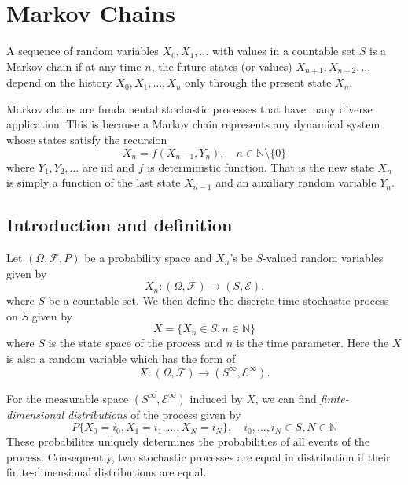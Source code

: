 \documentclass[twoside]{article}
\theoremstyle{definition}
\theoremstyle{remark}
\theoremstyle{remark}
\begin{document}
\section{Markov Chains}
A sequence of random variables $X_0, X_1, \ldots$ with values in a countable
set $S$ is a Markov chain if at any time $n$, the future states (or values)
$X_{n+1}, X_{n+2}, \ldots$ depend on the history $X_0, X_1, \ldots, X_n$ only
through the present state $X_n$.

Markov chains are fundamental stochastic processes that have many diverse
application. This is because a Markov chain represents any dynamical system
whose states satisfy the recursion
\begin{equation}
  X_n = f(X_{n-1}, Y_n), \quad n \in \mathbb{N} \setminus {\{0\}}
\end{equation}
where $Y_1, Y_2, \ldots$ are iid and $f$ is deterministic function. That is
the new state $X_n$ is simply a function of the last state $X_{n-1}$ and
an auxiliary random variable $Y_n$.

\subsection{Introduction and definition}
Let $(\Omega, \mathcal{F}, P)$ be a probability space and $X_n$'s be $S$-valued
random variables given by
\begin{equation}
  X_n : (\Omega, \mathcal{F}) \rightarrow (S, \mathcal{E}).
\end{equation}
where $S$ be a countable set. We then define the discrete-time stochastic
process on $S$ given by
\begin{equation}
  X = {\{ X_n \in S : n \in \mathbb{N} \}}
\end{equation}
where $S$ is the state space of the process and $n$ is the time parameter.
Here the $X$ is also a random variable which has the form of
\begin{equation}
  X : (\Omega, \mathcal{F}) \rightarrow (S^{\infty}, \mathcal{E}^{\infty}).
\end{equation}


For the measurable space $(S^{\infty}, \mathcal{E}^{\infty})$ induced by $X$,
we can find \textit{finite-dimensional distributions} of the process given by
\begin{equation}
  P{\{ X_0 = i_0, X_1 = i_1, \ldots, X_N = i_N \}}, \quad i_0, \ldots, i_N \in S, N \in \mathbb{N}
\end{equation}
These probabilites uniquely determines the probabilities of all events of the
process. Consequently, two stochastic processes are equal in distribution
if their finite-dimensional distributions are equal.
\end{document}
